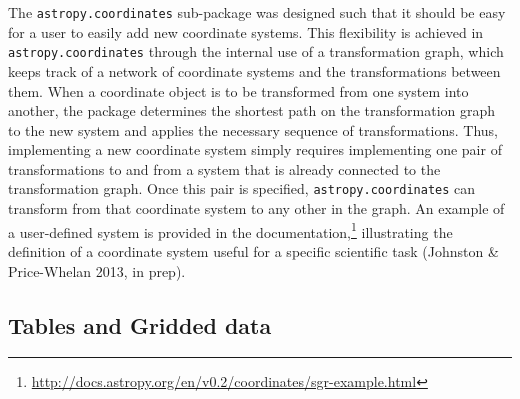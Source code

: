 \documentclass[traditabstract]{aa}
\begin{document}
The \texttt{astropy.coordinates} sub-package was designed such that it should be easy for a user to easily add new
coordinate systems.
This flexibility is achieved in \texttt{astropy.coordinates} through the internal use of
a transformation graph, which keeps track of a network of
coordinate systems and the transformations between them. When a coordinate
object is to be transformed from one system into another, the package
determines the shortest path on the transformation graph to the new system and
applies the necessary sequence of transformations. Thus, implementing a new
coordinate system simply requires implementing one pair of transformations to and
from a system that is already connected to the transformation graph. Once this
pair is specified, \texttt{astropy.coordinates} can transform from that
coordinate system to any other in the graph.
An example of a user-defined system is provided in the
documentation,\footnote{\url{http://docs.astropy.org/en/v0.2/coordinates/sgr-example.html}}
illustrating the definition of a coordinate system useful for a specific
scientific task (Johnston \& Price-Whelan 2013, in prep).

\subsection{Tables and Gridded data}


\label{sec:table}
\end{document}
